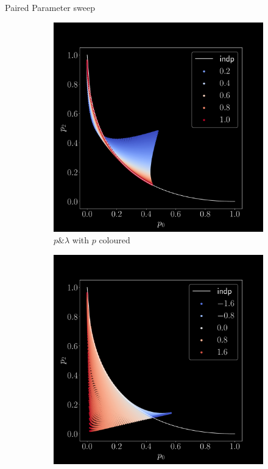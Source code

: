 \documentclass[aspectratio=169,9pt]{beamer}
\begin{document}
\begin{frame}{Paired Parameter sweep}
\begin{figure}[h]
\begin{adjustwidth}{-7cm}{-7cm}
\begin{subfigure}[b]{0.25\textwidth}
        \includegraphics[width=\textwidth]{sweep-pl-p}
        \caption{$p \& \lambda$ with $p$ coloured}
      \end{subfigure}\pause
      \begin{subfigure}[b]{0.25\textwidth}
        \centering
        \includegraphics[width=\textwidth]{sweep-ql-l}

\end{subfigure}
\end{adjustwidth}
\end{figure}
\end{frame}
\end{document}
